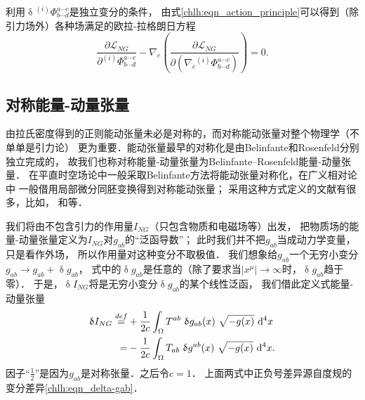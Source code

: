 利用$\updelta {}^{(i)}\Phi^{a\cdots c}_{b\cdots d}$是独立变分的条件，
由式\eqref{chlh:eqn_action_principle}可以得到（除引力场外）各种场满足的欧拉-拉格朗日方程
\begin{equation}\label{chlh:eqn_lagrange-Phi}
    \frac{\partial \mathscr{L}_{NG}}
    {\partial {}^{(i)}\Phi^{a\cdots c}_{b\cdots d}}
    -  \nabla_e \left( \frac{\partial \mathscr{L}_{NG}}
    {\partial (\nabla_e{}^{(i)}\Phi^{a\cdots c}_{b\cdots d})}\right)  =0.
\end{equation}




\subsection{对称能量-动量张量}\label{chlh:sec_BR-tensor}
由拉氏密度得到的正则能动张量未必是对称的，而对称能动张量对整个物理学（不单单是引力论）
更为重要．能动张量最早的对称化是由Belinfante和Rosenfeld分别独立完成的，
故我们也称对称能量-动量张量为Belinfante--Rosenfeld能量-动量张量．
在平直时空场论中一般采取Belinfante方法将能动张量对称化，在广义相对论中
一般借用局部微分同胚变换得到对称能动张量；
采用这种方式定义的文献有很多，比如\parencite[\S 94]{landau_2-classical-fields}，
\parencite[\S 12.2]{weinberg_grav-1972}和\parencite[\S 21.3]{mtw1973}等．

我们将由不包含引力的作用量$I_{NG}$（只包含物质和电磁场等）出发，
把物质场的能量-动量张量定义为$I_{NG}$对$g_{ab}$的“泛函导数”；
此时我们并不把$g_{ab}$当成动力学变量，只是看作外场，
所以作用量对这种变分不取极值．
我们想象给$g_{ab}$一个无穷小变分$g_{ab}\to g_{ab} + \updelta g_{ab}$，
式中的$\updelta g_{ab}$是任意的（除了要求当$|x^\mu|\to \infty$时，$\updelta g_{ab}$趋于零）．
于是，$\updelta I_{NG}$将是无穷小变分$\updelta g_{ab}$的某个线性泛函，
我们借此定义式能量-动量张量
\begin{equation}\label{chlh:def_BR-tensor}
    \begin{aligned}
    \updelta I_{NG} \overset{def}{=}& +\frac{1}{2c} \int_{\Omega}
    T^{ab} \ \updelta g_{ab}(x) \ \sqrt{-g(x)} \ {\rm d}^4 x \\
    =& -\frac{1}{2c} \int_{\Omega}
    T_{ab} \ \updelta g^{ab}(x) \ \sqrt{-g(x)} \ {\rm d}^4 x .
    \end{aligned}
\end{equation}
因子“$\frac{1}{2}$”是因为$g_{ab}$是对称张量．之后令$c=1$．
上面两式中正负号差异源自度规的变分差异\eqref{chlh:eqn_delta-gab}．





